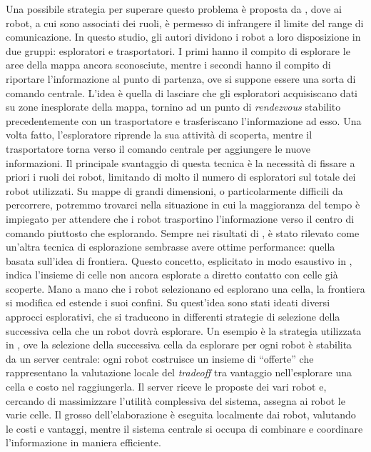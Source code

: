Una possibile strategia per superare questo problema è proposta da \cite{de2009role}, dove ai robot, a cui sono associati dei ruoli, è permesso di infrangere il limite del range di comunicazione. In questo studio, gli autori dividono i robot a loro disposizione in due gruppi: esploratori e trasportatori. I primi hanno il compito di esplorare le aree della mappa ancora sconosciute, mentre i secondi hanno il compito di riportare l'informazione al punto di partenza, ove si suppone essere una sorta di comando centrale. L'idea è quella di lasciare che gli esploratori acquisiscano dati su zone inesplorate della mappa, tornino ad un punto di \textit{rendezvous} stabilito precedentemente con un trasportatore e trasferiscano l'informazione ad esso. Una volta fatto, l'esploratore riprende la sua attività di scoperta, mentre il trasportatore torna verso il comando centrale per aggiungere le nuove informazioni. Il principale svantaggio di questa tecnica è la necessità di fissare a priori i ruoli dei robot, limitando di molto il numero di esploratori sul totale dei robot utilizzati. Su mappe di grandi dimensioni, o particolarmente difficili da percorrere, potremmo trovarci nella situazione in cui la maggioranza del tempo è impiegato per attendere che i robot trasportino l'informazione verso il centro di comando piuttosto che esplorando. Sempre nei risultati di \cite{de2009role}, è stato rilevato come un'altra tecnica di esplorazione sembrasse avere ottime performance: quella basata sull'idea di frontiera. Questo concetto, esplicitato in modo esaustivo in \cite{yamauchi1998frontier}, indica l'insieme di celle non ancora esplorate a diretto contatto con celle già scoperte. Mano a mano che i robot selezionano ed esplorano una cella, la frontiera si modifica ed estende i suoi confini. Su quest'idea sono stati ideati diversi approcci esplorativi, che si traducono in differenti strategie di selezione della successiva cella che un robot dovrà esplorare. Un esempio è la strategia utilizzata in \cite{simmons2000coordination}, ove la selezione della successiva cella da esplorare per ogni robot è stabilita da un server centrale: ogni robot costruisce un insieme di “offerte” che rappresentano la valutazione locale del \textit{tradeoff} tra vantaggio nell'esplorare una cella e costo nel raggiungerla. Il server riceve le proposte dei vari robot e, cercando di massimizzare l'utilità complessiva del sistema, assegna ai robot le varie celle. Il grosso dell'elaborazione è eseguita localmente dai robot, valutando le costi e vantaggi, mentre il sistema centrale si occupa di combinare e coordinare l'informazione in maniera efficiente.
